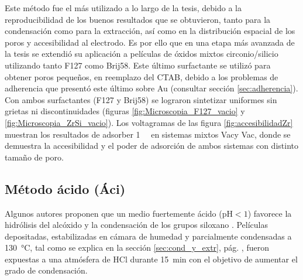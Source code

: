 		 Este método fue el más utilizado a lo largo de la tesis, debido a la reproducibilidad de los buenos resultados que se obtuvieron, tanto para la condensación como para la extracción, así como en la distribución espacial de los poros y accesibilidad al electrodo. Es por ello que en una etapa más avanzada de la tesis se extendió su aplicación a películas de óxidos mixtos circonio/silicio utilizando tanto F127 como Brij58. Este último surfactante se utilizó para obtener poros pequeños, en reemplazo del CTAB, debido a los problemas de adherencia que presentó este último sobre Au (consultar sección \ref{sec:adherencia}). Con ambos surfactantes (F127 y Brij58) se lograron sintetizar \pdm\space uniformes sin grietas ni discontinuidades (figuras \ref{fig:Microscopia_F127_vacio} y \ref{fig:Microscopia_ZrSi_vacio}). Los voltagramas de las figura \ref{fig:accesibilidadZr} muestran los resultados de adsorber \aminorutenio\space \SI{1}{\milli\Molar} en sistemas mixtos Vac\pdmZ\space y Vac\pdmZB, donde se demuestra la accesibilidad y el poder de adsorción de ambos sistemas con distinto tamaño de poro.

	 \subsection{Método ácido (Áci)}

	 	 Algunos autores proponen que un medio fuertemente ácido (pH$<1$) favorece la hidrólisis del alcóxido y la condensación de los grupos siloxano \cite{Soler-Illia2011,Doshi2000a,Huo1996,Boissiere2000,Beck1992}. Películas depositadas, estabilizadas en cámara de humedad y parcialmente condensadas a \SI{130}{\celsius}, tal como se explica en la sección \ref{sec:cond_y_extr}, pág. \pageref{sec:cond_y_extr}, fueron expuestas a una atmósfera de HCl durante \SI{15}{\minute} con el objetivo de aumentar el grado de condensación. 

